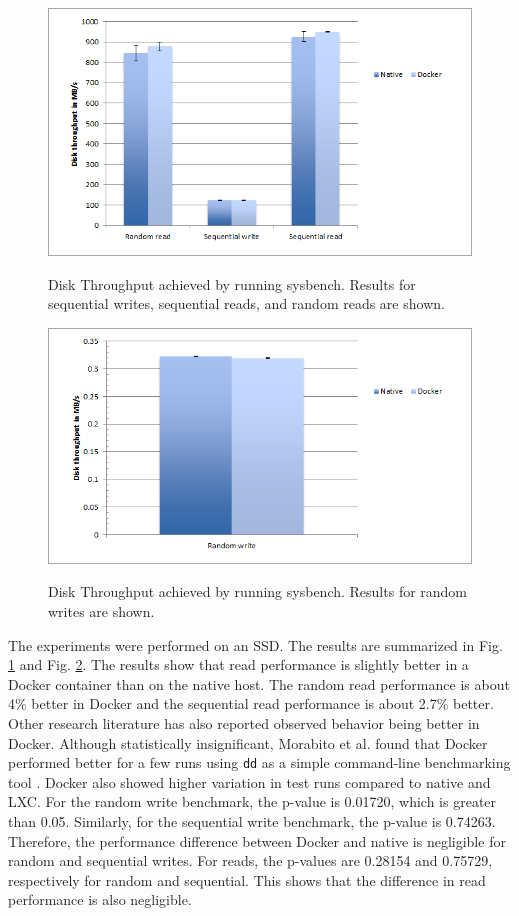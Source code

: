 \documentclass[11pt]{article}
\begin{document}
\begin{figure}
	\centering
	{\includegraphics[width=150mm]{disk1}}
	\caption{ Disk Throughput achieved by running sysbench.
		Results for sequential writes, sequential reads, and random reads are shown.
		 }
	\label{fig:disk1}
\end{figure}

\begin{figure}
	\centering
	{\includegraphics[width=150mm]{disk2}}
	\caption{ Disk Throughput achieved by running sysbench.
		Results for random writes are shown.
	}
	\label{fig:disk2}
\end{figure}

The experiments were performed on an SSD. The results are summarized in Fig. \ref{fig:disk1} and Fig. \ref{fig:disk2}. The results show that read performance is slightly better in a Docker container than on the native host. The random read performance is about 4\% better in Docker and the sequential read performance is about 2.7\% better. Other research literature has also reported observed behavior being better in Docker. Although statistically insignificant, Morabito et al. found that Docker performed better for a few runs using \texttt{dd} as a simple command-line benchmarking tool \cite{morabito}. Docker also showed higher variation in test runs compared to native and LXC. For the random write benchmark, the p-value is 0.01720, which is greater than 0.05. Similarly, for the sequential write benchmark, the p-value is 0.74263. Therefore, the performance difference between Docker and native is negligible for random and sequential writes. For reads, the p-values are 0.28154 and 0.75729, respectively for random and sequential. This shows that the difference in read performance is also negligible.  
\end{document}

